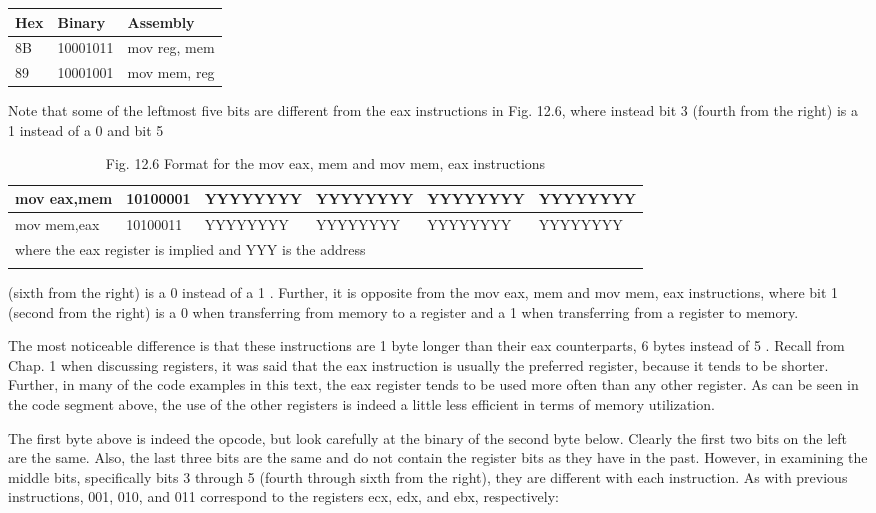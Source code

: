 \documentclass[10pt]{book}
\begin{document}
\begin{center}
\begin{tabular}{|l|l|l|}
\hline
Hex & Binary & Assembly \\
\hline
8B & 10001011 & mov reg, mem \\
\hline
89 & 10001001 & mov mem, reg \\
\hline
\end{tabular}
\end{center}

Note that some of the leftmost five bits are different from the eax instructions in Fig. 12.6, where instead bit 3 (fourth from the right) is a 1 instead of a 0 and bit 5


\begin{table}[htbp]
\begin{center}
\begin{tabular}{|l|l|l|l|l|l|}
\hline
mov eax,mem & 10100001 & YYYYYYYY & YYYYYYYY & YYYYYYYY & YYYYYYYY \\
\hline
mov mem,eax & 10100011 & YYYYYYYY & YYYYYYYY & YYYYYYYY & YYYYYYYY \\
\hline
\multicolumn{6}{|l|}{where the eax register is implied and YYY is the address} \\\index{add}
\hline
\end{tabular}
\captionsetup{labelformat=empty}
\caption{Fig. 12.6 Format for the mov eax, mem and mov mem, eax instructions}
\end{center}
\end{table}

(sixth from the right) is a 0 instead of a 1 . Further, it is opposite from the mov eax, mem and mov mem, eax instructions, where bit 1 (second from the right) is a 0 when transferring from memory to a register and a 1 when transferring from a register to memory.


The most noticeable difference is that these instructions are 1 byte longer than their eax counterparts, 6 bytes instead of 5 . Recall from Chap. 1 when discussing registers, it was said that the eax instruction is usually the preferred register, because it tends to be shorter. Further, in many of the code examples in this text, the eax register tends to be used more often than any other register. As can be seen in the code segment above, the use of the other registers is indeed a little less efficient in terms of memory utilization.

The first byte above is indeed the opcode, but look carefully at the binary of the second byte below. Clearly the first two bits on the left are the same. Also, the last three bits are the same and do not contain the register bits as they have in the past. However, in examining the middle bits, specifically bits 3 through 5 (fourth through sixth from the right), they are different with each instruction. As with previous instructions, 001, 010, and 011 correspond to the registers ecx, edx, and ebx, respectively:
\end{document}
